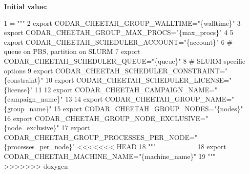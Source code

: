 {\bfseries Initial value\+:}
\begin{DoxyCode}
1 =  \textcolor{stringliteral}{"""}
2 \textcolor{stringliteral}{export CODAR\_CHEETAH\_GROUP\_WALLTIME="\{walltime\}"}
3 \textcolor{stringliteral}{export CODAR\_CHEETAH\_GROUP\_MAX\_PROCS="\{max\_procs\}"}
4 \textcolor{stringliteral}{}
5 \textcolor{stringliteral}{export CODAR\_CHEETAH\_SCHEDULER\_ACCOUNT="\{account\}"}
6 \textcolor{stringliteral}{# queue on PBS, partition on SLURM}
7 \textcolor{stringliteral}{export CODAR\_CHEETAH\_SCHEDULER\_QUEUE="\{queue\}"}
8 \textcolor{stringliteral}{# SLURM specific options}
9 \textcolor{stringliteral}{export CODAR\_CHEETAH\_SCHEDULER\_CONSTRAINT="\{constraint\}"}
10 \textcolor{stringliteral}{export CODAR\_CHEETAH\_SCHEDULER\_LICENSE="\{license\}"}
11 \textcolor{stringliteral}{}
12 \textcolor{stringliteral}{export CODAR\_CHEETAH\_CAMPAIGN\_NAME="\{campaign\_name\}"}
13 \textcolor{stringliteral}{}
14 \textcolor{stringliteral}{export CODAR\_CHEETAH\_GROUP\_NAME="\{group\_name\}"}
15 \textcolor{stringliteral}{export CODAR\_CHEETAH\_GROUP\_NODES="\{nodes\}"}
16 \textcolor{stringliteral}{export CODAR\_CHEETAH\_GROUP\_NODE\_EXCLUSIVE="\{node\_exclusive\}"}
17 \textcolor{stringliteral}{export CODAR\_CHEETAH\_GROUP\_PROCESSES\_PER\_NODE="\{processes\_per\_node\}"}
<<<<<<< HEAD
18 \textcolor{stringliteral}{"""}
=======
18 \textcolor{stringliteral}{export CODAR\_CHEETAH\_MACHINE\_NAME="\{machine\_name\}"}
19 \textcolor{stringliteral}{"""}
>>>>>>> doxygen
\end{DoxyCode}

